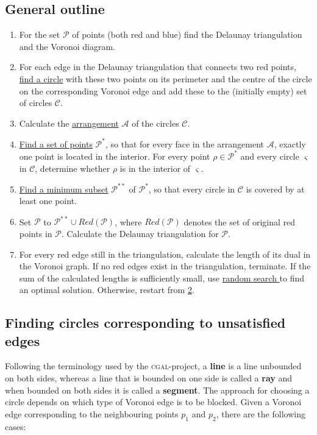\documentclass[a4paper,12pt]{article}
\begin{document}
\subsection{General outline}
\label{ref:Algorithm}
\begin{enumerate}
\item
For the set $\mathcal P$ of points (both red and blue) find the Delaunay triangulation and the Voronoi diagram.
\item
\label{alg:part2}
For each edge in the Delaunay triangulation that connects two red points, \hyperref[sec:findCircle]{find a circle} with these two points on its perimeter and the centre of the circle on the corresponding Voronoi edge and add these to the (initially empty) set of circles $\mathcal C$.
\item
Calculate the \hyperref[sec:arrangement]{arrangement} $\mathcal A$ of the circles $\mathcal C$.
\item
\hyperref[sec:findPoints]{Find a set of points} $\mathcal P^*$, so that for every face in the arrangement $\mathcal A$, exactly one point is located in the interior. For every point $\rho  \in \mathcal P^*$ and every circle $\varsigma$ in $\mathcal C$, determine whether $\rho$ is in the interior of $\varsigma$.
\item
\hyperref[sec:gurobi]{Find a minimum subset} $\mathcal P^{**}$ of $\mathcal P^*$, so that every circle in $\mathcal C$ is covered by at least one point.
\item
Set $\mathcal P$ to $\mathcal P^{**} \cup Red(\mathcal P )$, where  $Red(\mathcal P )$ denotes the set of original red points in $\mathcal P$. Calculate the Delaunay triangulation for $\mathcal P$.
\item
For every red edge still in the triangulation, calculate the length of its dual in the Voronoi graph. If no red edges exist in the triangulation, terminate. If the sum of the calculated lengths is sufficiently small, use \hyperref[sec:rand]{random search } to find an optimal solution. Otherwise, restart from \hyperref[alg:part2]{2}.
\end{enumerate}

\subsection{Finding circles corresponding to unsatisfied edges}
\label{sec:findCircle}
Following the terminology used by the \textsc{cgal}-project, a {\bf line} is a line unbounded on both sides, whereas a line that is bounded on one side is called a {\bf ray} and when bounded on both sides it is called a {\bf segment}. \newline 
The approach for choosing a circle depends on which type of Voronoi edge is to be blocked. Given a Voronoi edge corresponding to the neighbouring points $p_1$ and $p_2$, there are the following cases:
\end{document}
